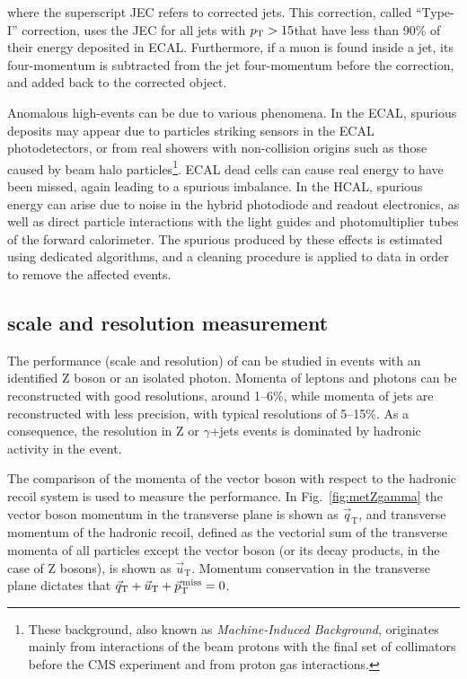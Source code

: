 where the superscript JEC refers to corrected jets. This correction, called ``Type-I'' correction, uses the JEC for all jets with $p_\mathrm{T}>15$\GeV that have less than 90\% of their energy deposited in ECAL. Furthermore, if a muon is found inside a jet, its four-momentum is subtracted from the jet four-momentum before the correction, and added back to the corrected object.

Anomalous high-\MET events can be due to various phenomena. In the ECAL, spurious deposits may appear due to particles striking sensors in the ECAL photodetectors, or from real showers with non-collision origins such as those caused by beam halo particles\footnote{These background, also known as \emph{Machine-Induced Background}, originates mainly from interactions of the beam protons with the final set of collimators before the CMS experiment and from proton gas interactions.}. ECAL dead cells can cause real energy to have been missed, again leading to a spurious imbalance. In the HCAL, spurious energy can arise due to noise in the hybrid photodiode and readout electronics, as well as direct particle interactions with the light guides and photomultiplier tubes of the forward calorimeter. The spurious \MET produced by these effects is estimated using dedicated algorithms, and a cleaning procedure is applied to data in order to remove the affected events.

\subsection{\MET scale and resolution measurement}
The performance (scale and resolution) of \MET can be studied in events with an identified Z boson or an isolated photon. Momenta of leptons and photons can be reconstructed with good resolutions, around 1--6\%, while momenta of jets are reconstructed with less precision, with typical resolutions of 5--15\%. As a consequence, the \MET resolution in Z or $\gamma$+jets events is dominated by hadronic activity in the event.

The comparison of the momenta of the vector boson with respect to the hadronic recoil system is used to measure the \MET performance. In Fig.~\ref{fig:metZgamma} the vector boson momentum in the transverse plane is shown as $\vec{q}_\mathrm{T}$, and transverse momentum of the hadronic recoil, defined as the vectorial sum of the transverse momenta of all particles except the vector boson (or its decay products, in the
case of Z bosons), is shown as $\vec{u}_\mathrm{T}$. Momentum conservation in the transverse plane dictates that $\vec{q}_\mathrm{T} + \vec{u}_\mathrm{T} + \vec{p}_\mathrm{T}^\mathrm{\,miss} = 0$.

